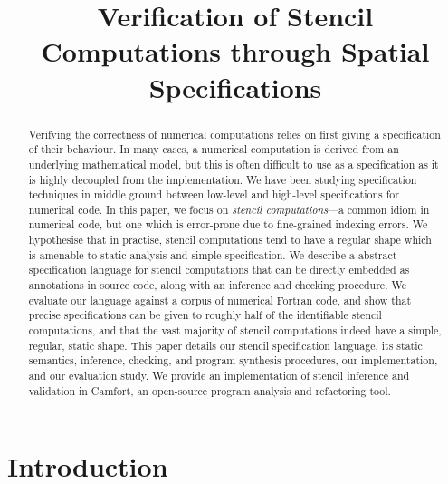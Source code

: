 \documentclass[9pt]{sigplanconf}
\title{Verification of Stencil Computations through Spatial Specifications}
\theoremstyle{definition}
\begin{document}
\maketitle

\begin{abstract}
  Verifying the correctness of numerical computations relies on first
  giving a specification of their behaviour. In many cases, a
  numerical computation is derived from an underlying mathematical
  model, but this is often difficult to use as a specification as it
  is highly decoupled from the implementation. We have been studying
  specification techniques in middle ground between low-level and
  high-level specifications for numerical code. In this paper, we
  focus on \emph{stencil computations}---a common idiom in numerical code, but
  one which is error-prone due to fine-grained indexing errors. We
  hypothesise that in practise, stencil computations tend to have a
  regular shape which is amenable to static analysis and simple
  specification. We describe a abstract specification language for
  stencil computations that can be directly embedded as annotations in
  source code, along with an inference and checking procedure. We
  evaluate our language against a corpus of numerical Fortran code,
  and show that precise specifications can be given to roughly half of
  the identifiable stencil computations, and that the vast majority of
  stencil computations indeed have a simple, regular, static
  shape. This paper details our stencil specification language, its
  static semantics, inference, checking, and program synthesis
  procedures, our implementation, and our evaluation study. We provide
  an implementation of stencil inference and validation in Camfort, an
  open-source program analysis and refactoring tool.
\end{abstract}




\section{Introduction}
\end{document}
